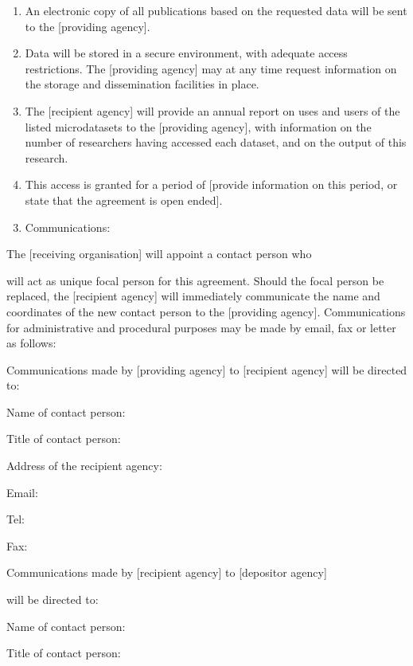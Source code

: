 \documentclass[letterpaper,10pt,english]{sphinxmanual}
\begin{document}
\begin{enumerate}
\item {} 
An electronic copy of all publications based on the requested data
will be sent to the {[}providing agency{]}.

\item {} 
Data will be stored in a secure environment, with adequate access
restrictions. The {[}providing agency{]} may at any time request
information on the storage and dissemination facilities in place.

\item {} 
The {[}recipient agency{]} will provide an annual report on uses and
users of the listed microdatasets to the {[}providing agency{]}, with
information on the number of researchers having accessed each
dataset, and on the output of this research.

\item {} 
This access is granted for a period of {[}provide information on this
period, or state that the agreement is open ended{]}.

\end{enumerate}
\begin{enumerate}
\setcounter{enumi}{2}
\item {} 
Communications:

\end{enumerate}

The {[}receiving organisation{]} will appoint a contact person who

will act as unique focal person for this agreement. Should the focal
person be replaced, the {[}recipient agency{]} will immediately communicate
the name and coordinates of the new contact person to the {[}providing
agency{]}. Communications for administrative and procedural purposes may
be made by email, fax or letter as follows:

Communications made by {[}providing agency{]} to {[}recipient agency{]} will be
directed to:

Name of contact person:

Title of contact person:

Address of the recipient agency:

Email:

Tel:

Fax:

Communications made by {[}recipient agency{]} to {[}depositor agency{]}

will be directed to:

Name of contact person:

Title of contact person:
\end{document}

